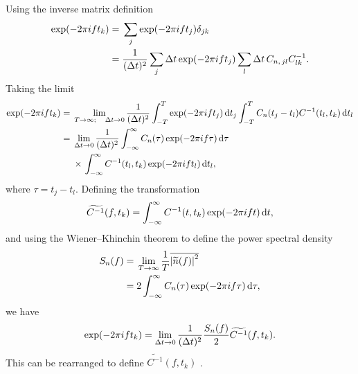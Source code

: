 Using the inverse matrix definition
\begin{align}
\exp(-2\pi i f t_k) = {} & \sum_j \exp(-2\pi ift_j) \delta_{jk} \nonumber \\
 = {} & \dfrac{1}{(\Delta t)^2} \sum_j \Delta t \exp(-2\pi ift_j) \sum_l \Delta t \, C_{n,\,jl}C^{-1}_{lk}.
\end{align}
Taking the limit
\begin{align}
\exp(-2\pi i f t_k) = {} & \lim_{T \rightarrow \infty; \quad \upDelta t \rightarrow 0} \recip{(\upDelta t)^2} \intd{-T}{T}{\exp(-2\pi ift_j)}{t_j} \intd{-T}{T}{C_n(t_j-t_l)C^{-1}(t_l,t_k)}{t_l} \nonumber \\
 = {} & \lim_{\upDelta t \rightarrow 0} \recip{(\upDelta t)^2} \intd{-\infty}{\infty}{C_n(\tau)\exp(-2\pi if\tau)}{\tau} \nonumber\\* %
 {} & \times \left. \intd{-\infty}{\infty}{C^{-1}(t_l,t_k)\exp(-2\pi if t_l)}{t_l},\right.
\end{align}
where $\tau = t_j - t_l$. Defining the transformation
\begin{equation}
\widetilde{C^{-1}}(f,t_k) = \int_{-\infty}^{\infty}{C^{-1}(t,t_k)\exp(-2\pi if t)}\,\mathrm{d}{t},
\end{equation}
and using the Wiener--Khinchin theorem to define the power spectral density \citep{Cutler1994}
\begin{align}
\label{eq:PSD-WK}
S_n(f) = {} & \lim_{T \rightarrow \infty} \dfrac{1}{T} \overline{\left|\widetilde{n}(f)\right|^2} \\
 = {} & 2 \int_{-\infty}^{\infty}{C_n(\tau)\exp(-2\pi i f\tau)}\,\mathrm{d}{\tau},
\end{align}
we have
\begin{equation}
\exp(-2\pi i f t_k) = \lim_{\Delta t \rightarrow 0} \dfrac{1}{(\Delta t)^2} \dfrac{S_n(f)}{2} \widetilde{C^{-1}}(f,t_k).
\end{equation}
This can be rearranged to define $\widetilde{C^{-1}}(f,t_k)$ \citep{Finn1992}.

